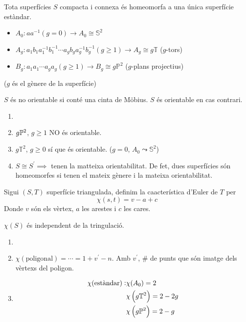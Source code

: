 \begin{teo*}[C]
    Tota superfícies $S$ compacta i connexa és homeomorfa a una única superfície estàndar.
    \begin{itemize}
	\item $A_0 \colon aa^{-1} (g = 0) \rightarrow A_0 \cong \mathbb{S}^2$
	\item $A_g \colon a_1b_1a^{-1}_1 b^{-1}_1 \cdots a_gb_ga^{-1}_gb^{-1}_g (g \geq 1)
	    \rightarrow A_g \cong g \mathbb{T}$ ($g$-tors)
	\item $B_g \colon a_1a_1 \cdots a_ga_g (g \geq 1) \rightarrow B_g \cong g \mathbb{P}^2$
	    ($g$-plans projectius)
    \end{itemize}
    ($g$ és el gènere de la superfície)
\end{teo*}

\begin{defi}[Orientabilitat]
    $S$ és no orientable si conté una cinta de Möbius. $S$ és orientable en cas contrari.
\end{defi}

\begin{example}
    \begin{enumerate}
	\item[]
	\item $g \mathbb{P}^2$, $g \geq 1$ NO és orientable.
	\item $g \mathbb{T}^2$, $g \geq 0$ sí que és orientable. ($g = 0$, $A_0 \leadsto \mathbb{S}^2$)
	\item $S \cong S^\prime \implies $ tenen la matteixa orientabilitat. De fet, dues superfícies
	    són homeomorfes si tenen el mateix gènere i la mateixa orientabilitat.
    \end{enumerate}
\end{example}

\begin{defi}
    Sigui $(S, T)$ superfície triangulada, definim la caacterística d'Euler de $T$ per
    \[
        \chi (s, t) = v - a + c
    \]
    Donde $v$ són els vèrtex, $a$ les arestes i $c$ les cares.
\end{defi}

\begin{teo*}
    $\chi(S)$ és independent de la tringulació.
\end{teo*}

\begin{example}
    \begin{enumerate}
	\item[]
	\item $\chi(\text{poligonal}) = \cdots = 1 + v^\prime - n$. Amb $v^\prime$, \# de punts que són
		imatge dels vèrtexs del poligon.
	\item
	    \[
		\begin{aligned}
		    \chi (\text{estàndar}) : & \chi(A_0) = 2 \\ & \chi \left( g \mathbb{T}^2 \right) = 2 -2g \\
		    & \chi \left( g\mathbb{P}^2 \right) = 2 - g 
		\end{aligned}
	    \]
    \end{enumerate}
\end{example}

